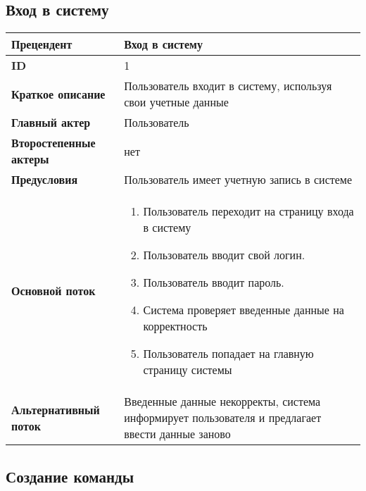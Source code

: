 \documentclass{article}
\begin{document}
\subsection{Вход в систему}

\begin{tabular}{|l|p{9cm}|}
	\hline
	\textbf{Прецендент}            & Вход в систему                                                                                  \\
	\hline
	\textbf{ID}                    & 1                                                                                               \\
	\hline
	\textbf{Краткое описание}      & Пользователь входит в систему, используя свои учетные данные                                    \\
	\hline
	\textbf{Главный актер}         & Пользователь                                                                                    \\
	\hline
	\textbf{Второстепенные актеры} & нет                                                                                             \\
	\hline
	\textbf{Предусловия}           & Пользователь имеет учетную запись в системе                                                     \\
	\hline
	\textbf{Основной поток}        & \begin{enumerate}
		                                 \item Пользователь переходит на страницу входа в систему
		                                 \item Пользователь вводит свой логин.
		                                 \item Пользователь вводит пароль.
		                                 \item Система проверяет введенные данные на корректность
		                                 \item Пользователь попадает на главную страницу системы
	                                 \end{enumerate}                                         \\
	\hline
	\textbf{Альтернативный поток}  & Введенные данные некорректы, система информирует пользователя и предлагает ввести данные заново \\
	\hline
\end{tabular}

\subsection{Создание команды}
\end{document}
